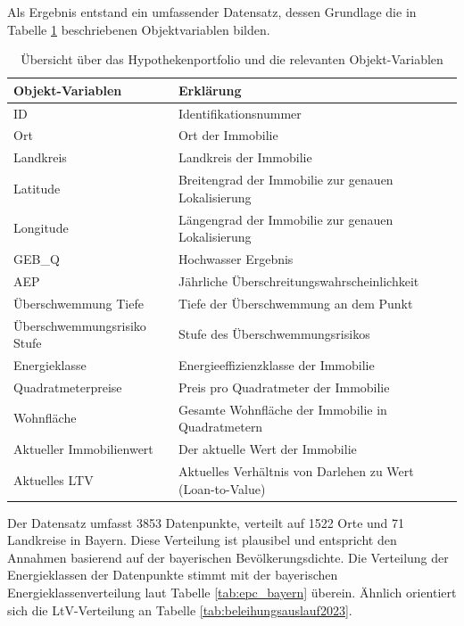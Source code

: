 Als Ergebnis entstand ein umfassender Datensatz, dessen Grundlage die in Tabelle \ref{tab:objekt-variablen} beschriebenen Objektvariablen bilden.
\begin{table}[htbp]
    \centering
    \small
    \caption{Übersicht über das Hypothekenportfolio und die relevanten Objekt-Variablen}
    \label{tab:objekt-variablen}
    \begin{tabularx}{1.0\textwidth}{>{\raggedright\arraybackslash}X >{\raggedright\arraybackslash}X}
        \toprule
        \textbf{Objekt-Variablen} & \textbf{Erklärung} \\
        \midrule
        ID & Identifikationsnummer \\
        \addlinespace
        Ort & Ort der Immobilie \\
        \addlinespace
        Landkreis & Landkreis der Immobilie \\
        \addlinespace
        Latitude & Breitengrad der Immobilie zur genauen Lokalisierung \\
        \addlinespace
        Longitude & Längengrad der Immobilie zur genauen Lokalisierung \\
        \addlinespace
        GEB\_Q & Hochwasser Ergebnis \\
        \addlinespace
        AEP & Jährliche Überschreitungswahrscheinlichkeit \\
        \addlinespace
        Überschwemmung Tiefe & Tiefe der Überschwemmung an dem Punkt \\
        \addlinespace
        Überschwemmungsrisiko Stufe & Stufe des Überschwemmungsrisikos \\
        \addlinespace
        Energieklasse & Energieeffizienzklasse der Immobilie \\
        \addlinespace
        Quadratmeterpreise & Preis pro Quadratmeter der Immobilie \\
        \addlinespace
        Wohnfläche & Gesamte Wohnfläche der Immobilie in Quadratmetern \\
        \addlinespace
        Aktueller Immobilienwert & Der aktuelle Wert der Immobilie \\
        \addlinespace        Aktuelles LTV & Aktuelles Verhältnis von Darlehen zu Wert (Loan-to-Value) \\
        \bottomrule
    \end{tabularx}
\end{table}
\FloatBarrier
Der Datensatz umfasst 3853 Datenpunkte, verteilt auf 1522 Orte und 71 Landkreise in Bayern. Diese Verteilung ist plausibel und entspricht den Annahmen basierend auf der bayerischen Bevölkerungsdichte. Die Verteilung der Energieklassen der Datenpunkte stimmt mit der bayerischen Energieklassenverteilung laut Tabelle \ref{tab:epc_bayern} überein. Ähnlich orientiert sich die LtV-Verteilung an Tabelle \ref{tab:beleihungsauslauf2023}.

